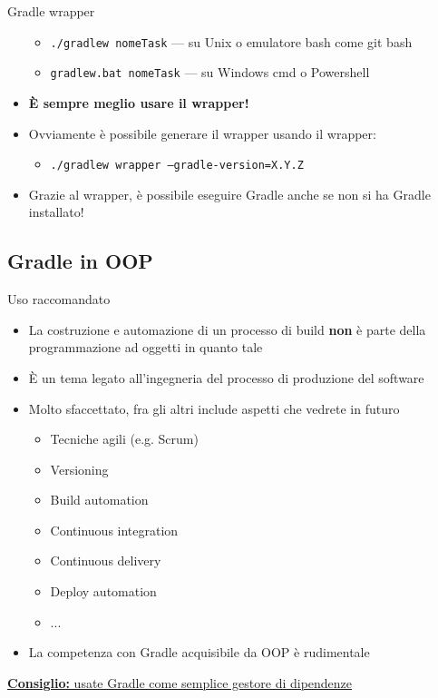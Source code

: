 \documentclass[presentation]{beamer}
\begin{document}
\begin{frame}[allowframebreaks]{Gradle wrapper}
\begin{itemize}
        \begin{itemize}
            \item \texttt{./gradlew nomeTask} --- su Unix o emulatore bash come git bash
            \item \texttt{gradlew.bat nomeTask} --- su Windows cmd o Powershell
        \end{itemize}
        \item \textbf{È sempre meglio usare il wrapper!}
        \item Ovviamente è possibile generare il wrapper usando il wrapper:
        \begin{itemize}
            \item \texttt{./gradlew wrapper --gradle-version=X.Y.Z}
        \end{itemize}
        \item Grazie al wrapper, è possibile eseguire Gradle anche se non si ha Gradle installato!
    \end{itemize}
\end{frame}

\subsection{Gradle in OOP}

\begin{frame}[fragile]{Uso raccomandato}
    \begin{itemize}
        \item La costruzione e automazione di un processo di build \textbf{non} è parte della programmazione ad oggetti in quanto tale
        \item È un tema legato all'ingegneria del processo di produzione del software
        \item Molto sfaccettato, fra gli altri include aspetti che vedrete in futuro
        \begin{itemize}
            \item Tecniche agili (e.g. Scrum)
            \item Versioning
            \item Build automation
            \item Continuous integration
            \item Continuous delivery
            \item Deploy automation
            \item ...
        \end{itemize}
        \item La competenza con Gradle acquisibile da OOP è rudimentale
    \end{itemize}
    \begin{center}
        \underline{\textbf{Consiglio:} usate Gradle come semplice gestore di dipendenze}
    \end{center}
\end{frame}
\end{document}
